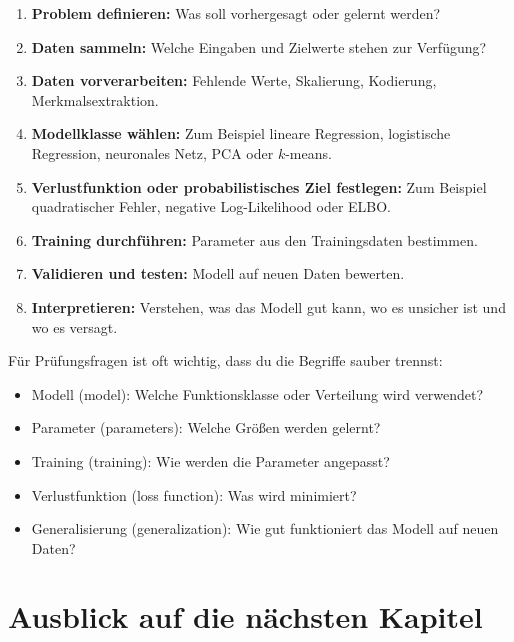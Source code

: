 \begin{enumerate}
    \item \textbf{Problem definieren:}
    Was soll vorhergesagt oder gelernt werden?

    \item \textbf{Daten sammeln:}
    Welche Eingaben und Zielwerte stehen zur Verfügung?

    \item \textbf{Daten vorverarbeiten:}
    Fehlende Werte, Skalierung, Kodierung, Merkmalsextraktion.

    \item \textbf{Modellklasse wählen:}
    Zum Beispiel lineare Regression, logistische Regression, neuronales Netz, PCA oder \(k\)-means.

    \item \textbf{Verlustfunktion oder probabilistisches Ziel festlegen:}
    Zum Beispiel quadratischer Fehler, negative Log-Likelihood oder ELBO.

    \item \textbf{Training durchführen:}
    Parameter aus den Trainingsdaten bestimmen.

    \item \textbf{Validieren und testen:}
    Modell auf neuen Daten bewerten.

    \item \textbf{Interpretieren:}
    Verstehen, was das Modell gut kann, wo es unsicher ist und wo es versagt.
\end{enumerate}

\begin{examtipbox}
Für Prüfungsfragen ist oft wichtig, dass du die Begriffe sauber trennst:

\begin{itemize}
    \item Modell (model): Welche Funktionsklasse oder Verteilung wird verwendet?
    \item Parameter (parameters): Welche Größen werden gelernt?
    \item Training (training): Wie werden die Parameter angepasst?
    \item Verlustfunktion (loss function): Was wird minimiert?
    \item Generalisierung (generalization): Wie gut funktioniert das Modell auf neuen Daten?
\end{itemize}
\end{examtipbox}

\section{Ausblick auf die nächsten Kapitel}

